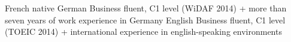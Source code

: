 

\begin{cvskills}

  \cvskill
    {French} %
    {native} %
  \cvskill
	{German} %
	{Business fluent, C1 level (WiDAF 2014) + more than seven years of work experience in Germany} %
  \cvskill
	{English} %
	{Business fluent, C1 level (TOEIC 2014) + international experience in english-speaking environments} %
\end{cvskills}
